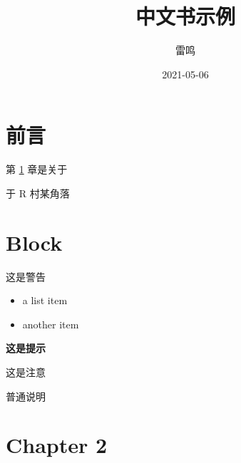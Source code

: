 \documentclass[]{ctexbook}
\title{中文书示例}
\author{雷鸣}
\date{2021-05-06}
\providecommand{\tightlist}{%
  \setlength{\itemsep}{0pt}\setlength{\parskip}{0pt}}
\begin{document}
\maketitle

{
\setcounter{tocdepth}{2}
\tableofcontents
}
\hypertarget{ux524dux8a00}{%
\chapter*{前言}\label{ux524dux8a00}}


第 \ref{chapter1} 章是关于

\begin{flushright}
于 R 村某角落
\end{flushright}

\mainmatter

\hypertarget{chapter1}{%
\chapter{Block}\label{chapter1}}

\citet{blei2017variational}

\begin{rmdwarn}
这是警告

\begin{itemize}
\tightlist
\item
  a list item
\item
  another item
\end{itemize}
\end{rmdwarn}

\begin{rmdtip}
\textbf{这是提示}
\end{rmdtip}

\begin{rmdnote}
这是注意
\end{rmdnote}

\begin{rmdinfo}
普通说明
\end{rmdinfo}

\hypertarget{chapter2}{%
\chapter{Chapter 2}\label{chapter2}}

\citep{kingma2013auto}



\backmatter
\printindex
\end{document}
